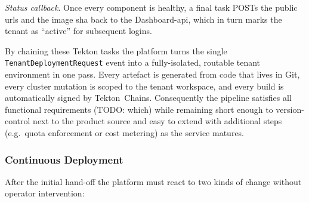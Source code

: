 \documentclass[11pt, a4paper, oneside, listof=totoc]{scrartcl}
\begin{document}
\begin{enumerate}[label={[\arabic*]:},
                    ref=Challenge~\arabic*,
                    leftmargin=*,
                    itemsep=0.6\baselineskip]
                    \item\label{chal:callback}
                        \textit{Status callback}.  
                        Once every component is healthy, a final task POSTs the public \glspl{url}
                        and the image \gls{sha} back to the Dashboard-\gls{api}, which in turn marks
                        the tenant as \enquote{active} for subsequent logins.
                        
                \end{enumerate}

                By chaining these Tekton tasks the platform turns the single
                \texttt{TenantDeploymentRequest} event into a fully-isolated, routable tenant
                environment in one pass.
                Every artefact is generated from code that lives in Git, every cluster mutation is
                scoped to the tenant workspace, and every build is automatically signed by
                Tekton~Chains.
                Consequently the pipeline satisfies all functional requirements (TODO: which) while
                remaining short enough to version-control next to the product source and easy to
                extend with additional steps (e.g.\ quota enforcement or cost metering) as the
                service matures.

            \subsubsection{Continuous Deployment}\label{subsubsec:continuousDeployment}
                After the initial hand-off the platform must react to two kinds of change without
                operator intervention:
\end{document}
